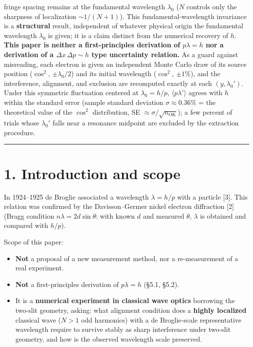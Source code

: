 \documentclass[11pt,a4paper]{article}
\providecommand{\tightlist}{\setlength{\itemsep}{0pt}\setlength{\parskip}{0pt}}
\begin{document}
fringe spacing remains at the fundamental wavelength \(\lambda_0\)
(\(N\) controls only the sharpness of localization \(\sim1/(N{+}1)\)).
This fundamental-wavelength invariance is a \textbf{structural} result,
independent of whatever physical origin the fundamental wavelength
\(\lambda_0\) is given; it is a claim distinct from the numerical
recovery of \(h\). \textbf{This paper is neither a first-principles
derivation of \(p\lambda=h\) nor a derivation of a
\(\Delta x\,\Delta p\sim h\) type uncertainty relation.} As a guard
against misreading, each electron is given an independent Monte Carlo
draw of its source position (\(\cos^2\), \(\pm\lambda_0/2\)) and its
initial wavelength (\(\cos^2\), \(\pm1\%\)), and the interference,
alignment, and exclusion are recomputed exactly at each
\((y,\lambda_0')\). Under this symmetric fluctuation centered at
\(\lambda_0=h/p\), \(\langle p\lambda'\rangle\) agrees with \(h\) within
the standard error (sample standard deviation \(\sigma\approx0.36\%\) =
the theoretical value of the \(\cos^2\) distribution, SE
\(\approx\sigma/\sqrt{n_{\mathrm{OK}}}\)); a few percent of trials whose
\(\lambda_0'\) falls near a resonance midpoint are excluded by the
extraction procedure.

\begin{center}\rule{0.5\linewidth}{0.5pt}\end{center}

\section{1. Introduction and scope}\label{introduction-and-scope}

In 1924--1925 de Broglie associated a wavelength \(\lambda=h/p\) with a
particle {[}3{]}. This relation was confirmed by the Davisson--Germer
nickel electron diffraction {[}2{]} (Bragg condition
\(n\lambda=2d\sin\theta\): with known \(d\) and measured \(\theta\),
\(\lambda\) is obtained and compared with \(h/p\)).

Scope of this paper:

\begin{itemize}
\tightlist
\item
  \textbf{Not} a proposal of a new measurement method, nor a
  re-measurement of a real experiment.
\item
  \textbf{Not} a first-principles derivation of \(p\lambda=h\) (§5.1,
  §5.2).
\item
  It is a \textbf{numerical experiment in classical wave optics}
  borrowing the two-slit geometry, asking: what alignment condition does
  a \textbf{highly localized} classical wave (\(N>1\) odd harmonics)
  with a de Broglie-scale representative wavelength require to survive
  stably as sharp interference under two-slit geometry, and how is the
  observed wavelength scale preserved.
\end{itemize}
\end{document}
